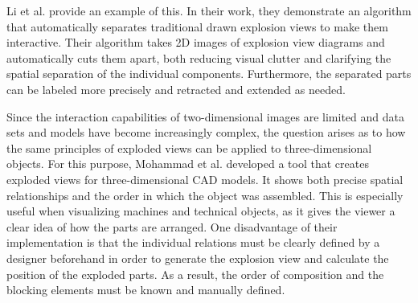 Li et al. provide an example of this.\cite{li2004interactive} In their work, they demonstrate an algorithm that automatically separates traditional drawn explosion views to make them interactive.
Their algorithm takes 2D images of explosion view diagrams and automatically cuts them apart, both reducing visual clutter and clarifying the spatial separation of the individual components. 
Furthermore, the separated parts can be labeled more precisely and retracted and extended as needed.

Since the interaction capabilities of two-dimensional images are limited and data sets and models have become increasingly complex, the question arises as to how the same principles of exploded views can be applied to three-dimensional objects.
For this purpose, Mohammad et al. developed a tool that creates exploded views for three-dimensional CAD models. It shows both precise spatial relationships and the order in which the object was assembled.\cite{Mohammad_1993}
This is especially useful when visualizing machines and technical objects, as it gives the viewer a clear idea of how the parts are arranged.
One disadvantage of their implementation is that the individual relations must be clearly defined by a designer beforehand in order to generate the explosion view and calculate the position of the exploded parts.
As a result, the order of composition and the blocking elements must be known and manually defined.

